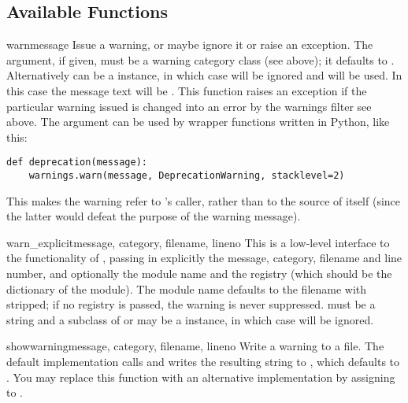 \subsection{Available Functions \label{warning-functions}}

\begin{funcdesc}{warn}{message}
Issue a warning, or maybe ignore it or raise an exception.  The
 argument, if given, must be a warning category class
(see above); it defaults to .  Alternatively
 can be a  instance, in which case
 will be ignored and  will be used.
In this case the message text will be . This function
raises an exception if the particular warning issued is changed
into an error by the warnings filter see above.  The 
argument can be used by wrapper functions written in Python, like
this:

\begin{verbatim}
def deprecation(message):
    warnings.warn(message, DeprecationWarning, stacklevel=2)
\end{verbatim}

This makes the warning refer to 's caller,
rather than to the source of  itself (since
the latter would defeat the purpose of the warning message).
\end{funcdesc}

\begin{funcdesc}{warn_explicit}{message, category, filename,
 lineno}
This is a low-level interface to the functionality of
, passing in explicitly the message, category,
filename and line number, and optionally the module name and the
registry (which should be the  dictionary of
the module).  The module name defaults to the filename with 
stripped; if no registry is passed, the warning is never suppressed.
 must be a string and  a subclass of
 or  may be a  instance,
in which case  will be ignored.
\end{funcdesc}

\begin{funcdesc}{showwarning}{message, category, filename,
			     lineno}
Write a warning to a file.  The default implementation calls
 and writes the resulting string to , which
defaults to .  You may replace this function with an
alternative implementation by assigning to
.
\end{funcdesc}

